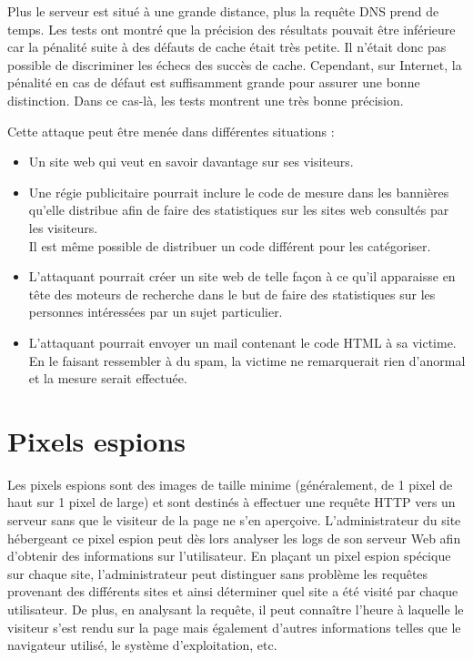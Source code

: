 Plus le serveur est situé à une grande distance, plus la requête DNS prend de temps. Les tests ont montré que la précision des résultats pouvait être inférieure car la pénalité suite à des défauts de cache était très petite. Il n'était donc pas possible de discriminer les échecs des succès de cache. Cependant, sur Internet, la pénalité en cas de défaut est suffisamment grande pour assurer une bonne distinction. Dans ce cas-là, les tests montrent une très bonne précision.
\newline


Cette attaque peut être menée dans différentes situations :
\begin{itemize}
  \item Un site web qui veut en savoir davantage sur ses visiteurs.
  \item Une régie publicitaire pourrait inclure le code de mesure dans les bannières qu'elle distribue afin de faire des statistiques sur les sites web consultés par les visiteurs.\\Il est même possible de distribuer un code différent pour les catégoriser.
  \item L'attaquant pourrait créer un site web de telle façon à ce qu'il apparaisse en tête des moteurs de recherche dans le but de faire des statistiques sur les personnes intéressées par un sujet particulier.
  \item L'attaquant pourrait envoyer un mail contenant le code HTML à sa victime.\\En le faisant ressembler à du spam, la victime ne remarquerait rien d'anormal et la mesure serait effectuée.
\end{itemize}



\section{Pixels espions}
Les pixels espions sont des images de taille minime (généralement, de 1 pixel de haut sur 1 pixel de large) et sont destinés à effectuer une requête HTTP vers un serveur sans que le visiteur de la page ne s'en aperçoive. L'administrateur du site hébergeant ce pixel espion peut dès lors analyser les logs de son serveur Web afin d'obtenir des informations sur l'utilisateur. En plaçant un pixel espion spécique sur chaque site, l'administrateur peut distinguer sans problème les requêtes provenant des différents sites et ainsi déterminer quel site a été visité par chaque utilisateur. De plus, en analysant la requête, il peut connaître l'heure à laquelle le visiteur s'est rendu sur la page mais également d'autres informations telles que le navigateur utilisé, le système d'exploitation, etc.

